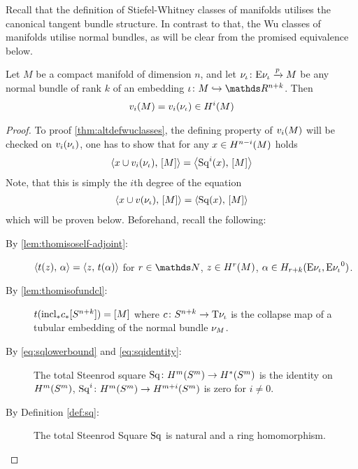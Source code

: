 Recall that the definition of Stiefel-Whitney classes of manifolds
utilises the canonical tangent bundle structure.
In contrast to that, the Wu classes of manifolds utilise normal
bundles, as will be clear from the promised equivalence below.
\begin{Thm}\label{thm:altdefwuclasses}
  Let $M$ be a compact manifold of dimension $n$, and let
  $\nu_{{\iota}}\colon \mathrm{E}\nu_{{\iota}} \xrightarrow{p} M$ be
  any normal bundle of rank $k$ of an embedding
  $\emb\colon M\immto\R^{n+k}$. Then
  \begin{gather*}
    {v_{i}}(M) = {v_{i}}(\nu_{{\iota}})\in H^i(M)
  \end{gather*}
  \begin{proof}
    To proof \autoref{thm:altdefwuclasses}, the defining property of
    ${v_{i}}(M)$ will be checked on ${v_{i}}(\nu_{{\iota}})$, \idest one has to show
    that for any $x\in H^{n-i}(M)$ holds
    \begin{gather*}
      \left\langle x\cup {v_{i}}(\nu_{{\iota}}),\, [M] \right\rangle
      = \left\langle \mathrm{Sq}^{i}(x),\, [M] \right\rangle
    \end{gather*}
    Note, that this is simply the $i$th degree of the equation
    \begin{gather}\label{eq:proofaltdefwuclasses:claim}
      \left\langle x\cup {v}(\nu_{{\iota}}),\, [M] \right\rangle
      = \left\langle \mathrm{Sq}(x),\, [M] \right\rangle
    \end{gather}
    which will be proven below.
    Beforehand, recall the following:
    \begin{description}
    \item[By \autoref{lem:thomisoself-adjoint}:]
      $\left\langle t(z),\, \alpha \right\rangle = \left\langle z,\, t(\alpha) \right\rangle$
      for $r\in\Nat$, $z\in H^r(M)$,
      $\alpha\in H_{r+k}(\mathrm{E}\nu_{{\iota}}, {\mathrm{E}\nu_{{\iota}}}^0)$.
    \item[By \autoref{lem:thomisofundcl}:]
      $t({\mathrm{incl}}_*{c}_*[S^{n+k}]) = [M]$
      where $c\colon S^{n+k}\to \mathrm{T}{\nu_{{\iota}}}$ is
      the collapse map of a tubular embedding of the normal bundle $\nu_{M}$.
    \item[By \eqref{eq:sqlowerbound} and \eqref{eq:sqidentity}:]
      The total Steenrod square
      $\mathrm{Sq}\colon H^m(S^{m})
      \to H^*(S^{m})$
      is the identity on $H^m(S^{m})$, \idest
      $\mathrm{Sq}^{i}\colon H^m(S^{m})\to H^{m+i}(S^{m})$ is zero for
      $i\neq0$.
    \item[By Definition \autoref{def:sq}:] The total Steenrod Square
      $\mathrm{Sq}$ is natural and a ring homomorphism.

\end{description}
\end{proof}
\end{Thm}

